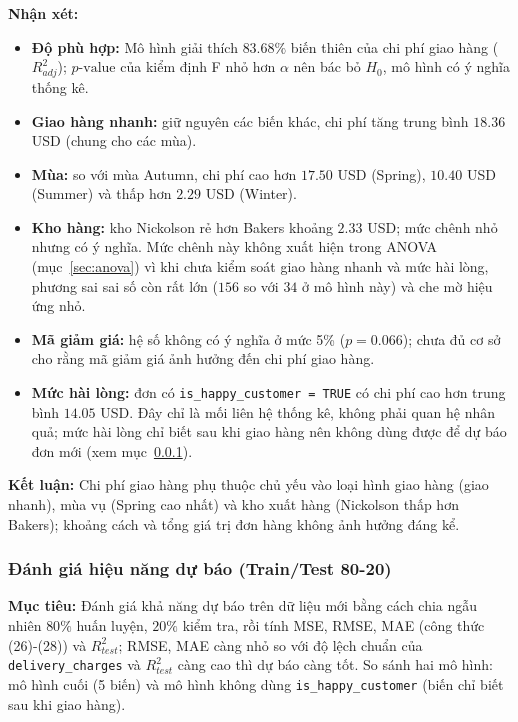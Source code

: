 \textbf{Nhận xét:}
\begin{itemize}
    \item[-] \textbf{Độ phù hợp:} Mô hình giải thích $83.68\%$ biến thiên của chi phí giao hàng ($R^2_{adj}$); $p\text{-value}$ của kiểm định F nhỏ hơn $\alpha$ nên bác bỏ $H_0$, mô hình có ý nghĩa thống kê.
    \item[-] \textbf{Giao hàng nhanh:} giữ nguyên các biến khác, chi phí tăng trung bình $18.36$ USD (chung cho các mùa).
    \item[-] \textbf{Mùa:} so với mùa Autumn, chi phí cao hơn $17.50$ USD (Spring), $10.40$ USD (Summer) và thấp hơn $2.29$ USD (Winter).
    \item[-] \textbf{Kho hàng:} kho Nickolson rẻ hơn Bakers khoảng $2.33$ USD; mức chênh nhỏ nhưng có ý nghĩa. Mức chênh này không xuất hiện trong ANOVA (mục~\ref{sec:anova}) vì khi chưa kiểm soát giao hàng nhanh và mức hài lòng, phương sai sai số còn rất lớn ($156$ so với $34$ ở mô hình này) và che mờ hiệu ứng nhỏ.
    \item[-] \textbf{Mã giảm giá:} hệ số không có ý nghĩa ở mức 5\% ($p = 0.066$); chưa đủ cơ sở cho rằng mã giảm giá ảnh hưởng đến chi phí giao hàng.
    \item[-] \textbf{Mức hài lòng:} đơn có \texttt{is\_happy\_customer = TRUE} có chi phí cao hơn trung bình $14.05$ USD. Đây chỉ là mối liên hệ thống kê, không phải quan hệ nhân quả; mức hài lòng chỉ biết sau khi giao hàng nên không dùng được để dự báo đơn mới (xem mục~\ref{sec:tt}).
\end{itemize}

\textbf{Kết luận:} Chi phí giao hàng phụ thuộc chủ yếu vào loại hình giao hàng (giao nhanh), mùa vụ (Spring cao nhất) và kho xuất hàng (Nickolson thấp hơn Bakers); khoảng cách và tổng giá trị đơn hàng không ảnh hưởng đáng kể.

\subsubsection{Đánh giá hiệu năng dự báo (Train/Test 80-20)}\label{sec:tt}
\textbf{Mục tiêu:} Đánh giá khả năng dự báo trên dữ liệu mới bằng cách chia ngẫu nhiên $80\%$ huấn luyện, $20\%$ kiểm tra, rồi tính MSE, RMSE, MAE (công thức (26)-(28)) và $R^2_{test}$; RMSE, MAE càng nhỏ so với độ lệch chuẩn của \texttt{delivery\_charges} và $R^2_{test}$ càng cao thì dự báo càng tốt. So sánh hai mô hình: mô hình cuối (5 biến) và mô hình không dùng \texttt{is\_happy\_customer} (biến chỉ biết sau khi giao hàng).

